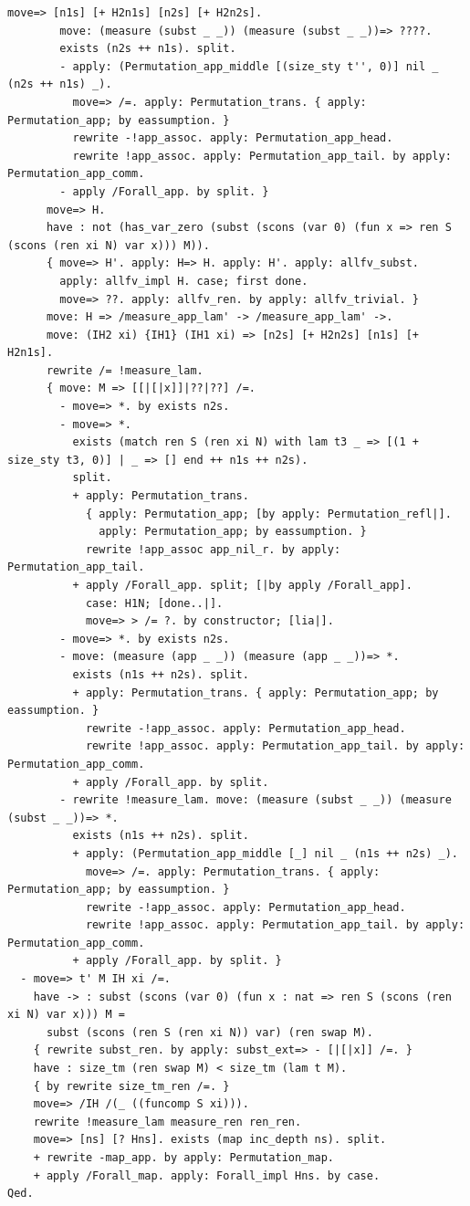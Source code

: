 \begin{lstlisting}[style=authorcoq]
        move=> [n1s] [+ H2n1s] [n2s] [+ H2n2s].
        move: (measure (subst _ _)) (measure (subst _ _))=> ????.
        exists (n2s ++ n1s). split.
        - apply: (Permutation_app_middle [(size_sty t'', 0)] nil _ (n2s ++ n1s) _).
          move=> /=. apply: Permutation_trans. { apply: Permutation_app; by eassumption. }
          rewrite -!app_assoc. apply: Permutation_app_head.
          rewrite !app_assoc. apply: Permutation_app_tail. by apply: Permutation_app_comm.
        - apply /Forall_app. by split. }
      move=> H. 
      have : not (has_var_zero (subst (scons (var 0) (fun x => ren S (scons (ren xi N) var x))) M)).
      { move=> H'. apply: H=> H. apply: H'. apply: allfv_subst.
        apply: allfv_impl H. case; first done.
        move=> ??. apply: allfv_ren. by apply: allfv_trivial. }
      move: H => /measure_app_lam' -> /measure_app_lam' ->.
      move: (IH2 xi) {IH1} (IH1 xi) => [n2s] [+ H2n2s] [n1s] [+ H2n1s].
      rewrite /= !measure_lam.
      { move: M => [[|[|x]]|??|??] /=.
        - move=> *. by exists n2s.
        - move=> *.
          exists (match ren S (ren xi N) with lam t3 _ => [(1 + size_sty t3, 0)] | _ => [] end ++ n1s ++ n2s).
          split.
          + apply: Permutation_trans.
            { apply: Permutation_app; [by apply: Permutation_refl|].
              apply: Permutation_app; by eassumption. }
            rewrite !app_assoc app_nil_r. by apply: Permutation_app_tail.
          + apply /Forall_app. split; [|by apply /Forall_app].
            case: H1N; [done..|].
            move=> > /= ?. by constructor; [lia|].
        - move=> *. by exists n2s.
        - move: (measure (app _ _)) (measure (app _ _))=> *.
          exists (n1s ++ n2s). split.
          + apply: Permutation_trans. { apply: Permutation_app; by eassumption. }
            rewrite -!app_assoc. apply: Permutation_app_head.
            rewrite !app_assoc. apply: Permutation_app_tail. by apply: Permutation_app_comm.
          + apply /Forall_app. by split.
        - rewrite !measure_lam. move: (measure (subst _ _)) (measure (subst _ _))=> *.
          exists (n1s ++ n2s). split.
          + apply: (Permutation_app_middle [_] nil _ (n1s ++ n2s) _).
            move=> /=. apply: Permutation_trans. { apply: Permutation_app; by eassumption. }
            rewrite -!app_assoc. apply: Permutation_app_head.
            rewrite !app_assoc. apply: Permutation_app_tail. by apply: Permutation_app_comm.
          + apply /Forall_app. by split. }
  - move=> t' M IH xi /=.
    have -> : subst (scons (var 0) (fun x : nat => ren S (scons (ren xi N) var x))) M = 
      subst (scons (ren S (ren xi N)) var) (ren swap M).
    { rewrite subst_ren. by apply: subst_ext=> - [|[|x]] /=. }
    have : size_tm (ren swap M) < size_tm (lam t M).
    { by rewrite size_tm_ren /=. }
    move=> /IH /(_ ((funcomp S xi))).
    rewrite !measure_lam measure_ren ren_ren.
    move=> [ns] [? Hns]. exists (map inc_depth ns). split.
    + rewrite -map_app. by apply: Permutation_map.
    + apply /Forall_map. apply: Forall_impl Hns. by case.
Qed.


\end{lstlisting}
